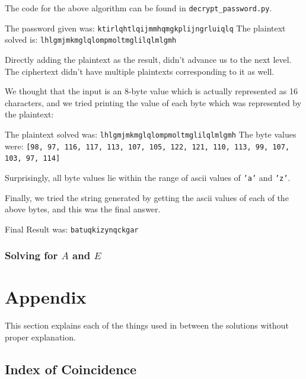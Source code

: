 \documentclass[10pt,twoside]{article}
\begin{document}
The code for the above algorithm can be found in \texttt{decrypt\_password.py}. \newline

The password given was: \texttt{ktirlqhtlqijmmhqmgkplijngrluiqlq} \newline
The plaintext solved is: \texttt{lhlgmjmkmglqlompmoltmglilqlmlgmh} \newline

Directly adding the plaintext as the result, didn't advance us to the next level. \newline
The ciphertext didn't have multiple plaintexts corresponding to it as well. \newline

We thought that the input is an 8-byte value which is actually represented as 16 characters, and we tried printing the value of each byte which was represented by the plaintext: \newline

The plaintext solved was: \texttt{lhlgmjmkmglqlompmoltmglilqlmlgmh} \newline
The byte values were: \newline
\texttt{[98, 97, 116, 117, 113, 107, 105, 122, 121, 110, 113, 99, 107, 103, 97, 114]} \newline

Surprisingly, all byte values lie within the range of ascii values of \texttt{'a'} and \texttt{'z'}. \newline

Finally, we tried the string generated by getting the ascii values of each of the above bytes, and this was the final answer. \newline

Final Result was: \texttt{batuqkizynqckgar}

\subsubsection{Solving for $A$ and $E$}

\newpage
\section{Appendix}

This section explains each of the things used in between the solutions without proper explanation.

\subsection{Index of Coincidence} \label{ic}
\end{document}
